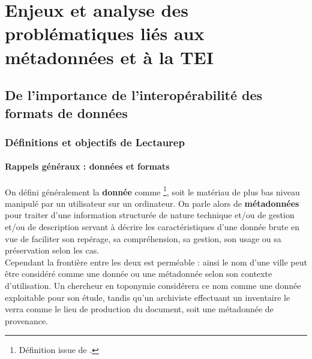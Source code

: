 \chapter{Enjeux et analyse des problématiques liés aux métadonnées et à la TEI} %
\section{De l'importance de l'interopérabilité des formats de données}
\subsection{Définitions et objectifs de Lectaurep}
\subsubsection{Rappels généraux : données et formats}

On défini généralement la \textbf{donnée} comme \footnote{Définition issue de \cite{noauthor_abrege_2020}.}, soit le matériau de plus bas niveau manipulé par un utilisateur sur un ordinateur. On parle alors de \textbf{métadonnées} pour traiter d'une information structurée de nature technique et/ou de gestion et/ou de description servant à décrire les caractéristiques d'une donnée brute en vue de faciliter son repérage, sa compréhension, sa gestion, son usage ou sa préservation selon les cas.\\

Cependant la frontière entre les deux est perméable : ainsi le nom d'une ville peut être considéré comme une donnée ou une métadonnée selon son contexte d'utilisation. Un chercheur en toponymie considérera ce nom comme une donnée exploitable pour son étude, tandis qu'un archiviste effectuant un inventaire le verra comme le lieu de production du document, soit une métadonnée de provenance.\\ 

